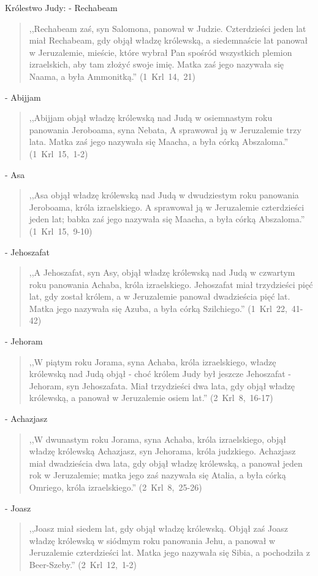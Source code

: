\documentclass[10pt,a4paper,oneside]{article}
\begin{document}
Królestwo Judy:
- Rechabeam
\begin{quote}
,,Rechabeam zaś, syn Salomona, panował w Judzie. Czterdzieści jeden lat miał Rechabeam, gdy objął władzę królewską, a siedemnaście lat panował w Jeruzalemie, mieście, które wybrał Pan spośród wszystkich plemion izraelskich, aby tam złożyć swoje imię. Matka zaś jego nazywała się Naama, a była Ammonitką.'' \mbox{(1 Krl 14, 21)}
\end{quote}
- Abijjam
\begin{quote}
,,Abijjam objął władzę królewską nad Judą w osiemnastym roku panowania Jeroboama, syna Nebata, A sprawował ją w Jeruzalemie trzy lata. Matka zaś jego nazywała się Maacha, a była córką Abszaloma.'' \mbox{(1 Krl 15, 1-2)}
\end{quote}
- Asa
\begin{quote}
,,Asa objął władzę królewską nad Judą w dwudziestym roku panowania Jeroboama, króla izraelskiego. A sprawował ją w Jeruzalemie czterdzieści jeden lat; babka zaś jego nazywała się Maacha, a była córką Abszaloma.'' \mbox{(1 Krl 15, 9-10)}
\end{quote}
- Jehoszafat
\begin{quote}
,,A Jehoszafat, syn Asy, objął władzę królewską nad Judą w czwartym roku panowania Achaba, króla izraelskiego. Jehoszafat miał trzydzieści pięć lat, gdy został królem, a w Jeruzalemie panował dwadzieścia pięć lat. Matka jego nazywała się Azuba, a była córką Szilchiego.'' \mbox{(1 Krl 22, 41-42)}
\end{quote}
- Jehoram
\begin{quote}
,,W piątym roku Jorama, syna Achaba, króla izraelskiego, władzę królewską nad Judą objął - choć królem Judy był jeszcze Jehoszafat - Jehoram, syn Jehoszafata. Miał trzydzieści dwa lata, gdy objął władzę królewską, a panował w Jeruzalemie osiem lat.'' \mbox{(2 Krl 8, 16-17)}
\end{quote}
- Achazjasz
\begin{quote}
,,W dwunastym roku Jorama, syna Achaba, króla izraelskiego, objął władzę królewską Achazjasz, syn Jehorama, króla judzkiego. Achazjasz miał dwadzieścia dwa lata, gdy objął władzę królewską, a panował jeden rok w Jeruzalemie; matka jego zaś nazywała się Atalia, a była córką Omriego, króla izraelskiego.'' \mbox{(2 Krl 8, 25-26)}
\end{quote}
- Joasz
\begin{quote}
,,Joasz miał siedem lat, gdy objął władzę królewską. Objął zaś Joasz władzę królewską w siódmym roku panowania Jehu, a panował w Jeruzalemie czterdzieści lat. Matka jego nazywała się Sibia, a pochodziła z Beer-Szeby.'' \mbox{(2 Krl 12, 1-2)}
\end{quote}
\end{document}
